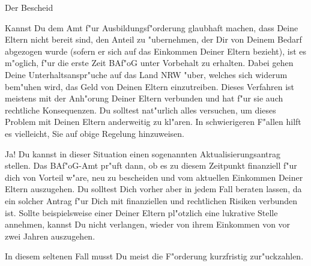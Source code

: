 \begin{artikel}{Der Bescheid}
\vspace*{-1ex}


Kannst Du dem Amt f"ur Ausbildungsf"orderung glaubhaft machen, dass Deine Eltern nicht bereit sind, den Anteil zu "ubernehmen, der Dir von Deinem Bedarf abgezogen wurde (sofern er sich auf das Einkommen Deiner Eltern bezieht), ist es m"oglich, f"ur die erste Zeit BAf"oG unter Vorbehalt zu erhalten. Dabei gehen Deine Unterhaltsanspr"uche auf das Land NRW "uber, welches sich widerum bem"uhen wird, das Geld von Deinen Eltern einzutreiben. Dieses Verfahren ist meistens mit der Anh"orung Deiner Eltern verbunden und hat f"ur sie auch rechtliche Konsequenzen. Du solltest nat"urlich alles versuchen, um dieses Problem mit Deinen Eltern anderweitig zu kl"aren. In schwierigeren F"allen hilft es vielleicht, Sie auf obige Regelung hinzuweisen. 

\vfill

Ja! Du kannst in dieser Situation einen sogenannten Aktualisierungsantrag stellen. Das BAf"oG-Amt pr"uft dann, ob es zu diesem Zeitpunkt finanziell f"ur dich von Vorteil w"are, neu zu bescheiden und vom aktuellen Einkommen Deiner Eltern auszugehen. Du solltest Dich vorher aber in jedem Fall beraten lassen, da ein solcher Antrag f"ur Dich mit finanziellen und rechtlichen Risiken verbunden ist. 
Sollte beispielsweise einer Deiner Eltern pl"otzlich eine lukrative Stelle annehmen, kannst Du nicht verlangen, wieder von ihrem Einkommen von vor zwei Jahren auszugehen.

In diesem seltenen Fall musst Du meist die F"orderung kurzfristig zur"uckzahlen.
\end{artikel}
